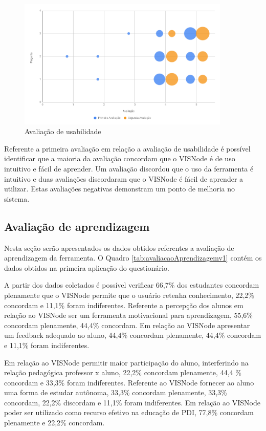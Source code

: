 \documentclass[
	12pt,				%
	oneside,			%
	a4paper,			%
	english,			%
	french,				%
	spanish,			%
	brazil,				%
	]{abntex2}
\begin{document}
\begin{figure}[H]
\centering
\caption{Avaliação de usabilidade}\label{fig:avaliacaoUsabilidade}
\includegraphics[width=0.9\textwidth]{imagens/avaliacao_usabilidade.png}
\sourceAuthor
\end{figure}

Referente a primeira avaliação em relação a avaliação de usabilidade é possível identificar que a maioria da avaliação concordam que o VISNode é de uso intuitivo e fácil de aprender. Um avaliação discordou que o uso da ferramenta é intuitivo e duas avaliações discordaram que o VISNode é fácil de aprender a utilizar. Estas avaliações negativas demonstram um ponto de melhoria no sistema.

\subsection{Avaliação de aprendizagem}

Nesta seção serão apresentados os dados obtidos referentes a avaliação de aprendizagem da ferramenta. O Quadro \ref{tab:avaliacaoAprendizagemv1} contém os dados obtidos na primeira aplicação do questionário. 

A partir dos dados coletados é possível verificar 66,7\% dos estudantes concordam plenamente que o VISNode permite que o usuário retenha conhecimento, 22,2\% concordam e 11,1\% foram indiferentes. Referente a percepção dos alunos em relação ao VISNode ser um ferramenta motivacional para aprendizagem, 55,6\% concordam plenamente, 44,4\% concordam. Em relação ao VISNode apresentar um feedback adequado ao aluno, 44,4\%  concordam plenamente, 44,4\% concordam e 11,1\% foram indiferentes.

Em relação ao VISNode permitir maior participação do aluno, interferindo na relação pedagógica professor x aluno, 22,2\% concordam plenamente, 44,4 \% concordam e 33,3\% foram indiferentes. Referente ao VISNode fornecer ao aluno uma forma de estudar autônoma, 33,3\% concordam plenamente, 33,3\% concordam, 22,2\% discordam e 11,1\% foram indiferentes. Em relação ao VISNode poder ser utilizado como recurso efetivo na educação de PDI, 77,8\% concordam plenamente e 22,2\% concordam.
\end{document}

